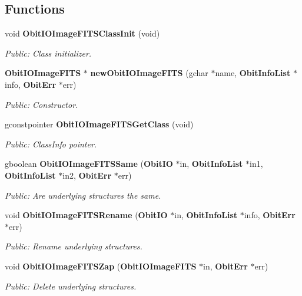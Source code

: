 \subsection*{Functions}
\begin{CompactItemize}
\item 
void {\bf Obit\-IOImage\-FITSClass\-Init} (void)
\begin{CompactList}\small\item\em Public: Class initializer. \item\end{CompactList}\item 
{\bf Obit\-IOImage\-FITS} $\ast$ {\bf new\-Obit\-IOImage\-FITS} (gchar $\ast$name, {\bf Obit\-Info\-List} $\ast$info, {\bf Obit\-Err} $\ast$err)
\begin{CompactList}\small\item\em Public: Constructor. \item\end{CompactList}\item 
gconstpointer {\bf Obit\-IOImage\-FITSGet\-Class} (void)
\begin{CompactList}\small\item\em Public: Class\-Info pointer. \item\end{CompactList}\item 
gboolean {\bf Obit\-IOImage\-FITSSame} ({\bf Obit\-IO} $\ast$in, {\bf Obit\-Info\-List} $\ast$in1, {\bf Obit\-Info\-List} $\ast$in2, {\bf Obit\-Err} $\ast$err)
\begin{CompactList}\small\item\em Public: Are underlying structures the same. \item\end{CompactList}\item 
void {\bf Obit\-IOImage\-FITSRename} ({\bf Obit\-IO} $\ast$in, {\bf Obit\-Info\-List} $\ast$info, {\bf Obit\-Err} $\ast$err)
\begin{CompactList}\small\item\em Public: Rename underlying structures. \item\end{CompactList}\item 
void {\bf Obit\-IOImage\-FITSZap} ({\bf Obit\-IOImage\-FITS} $\ast$in, {\bf Obit\-Err} $\ast$err)
\begin{CompactList}\small\item\em Public: Delete underlying structures. \item\end{CompactList}\item 

\end{CompactItemize}

